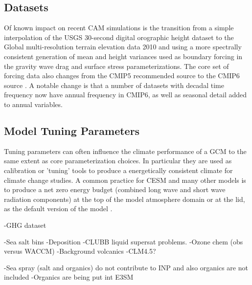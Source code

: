 \subsection{Datasets}
Of known impact on recent CAM simulations is the transition from a simple interpolation of the USGS 30-second digital orographic height dataset \citep[GTOPO30,][]{Gesch1999} to the Global multi-resolution terrain elevation data 2010 \citep[GMTED2010,][]{Danielson2011} and using a more spectrally consistent generation of mean and height variances \citep{Lauritzen2015} used as boundary forcing in the gravity wave drag and surface stress \citep{Beljaars2004} parameterizations. The core set of forcing data also changes from the CMIP5 \citep{Lamarque2010} recommended source to the CMIP6 source \citep{Feng2020}. A notable change is that a number of datasets with decadal time frequency now have annual frequency in CMIP6, as well as seasonal detail added to annual variables.

\subsection{Model Tuning Parameters}
Tuning parameters can often influence the climate performance of a GCM to the same extent as core parameterization choices. In particular they are used as calibration or 'tuning' tools to produce a energetically consistent climate for climate change studies. A common practice for CESM and many other models \citep{Schmidt2017} is to produce a net zero energy budget (combined long wave and short wave radiation components) at the top of the model atmosphere domain or at the lid, as the default version of the model \citep{Danabasoglu2020}.

-GHG dataset

-Sea salt bins
-Deposition
-CLUBB liquid supersat problems.
-Ozone chem (obs versus WACCM)
-Background volcanics
-CLM4.5?

-Sea spray (salt and organics) do not contribute to INP and also organics are not included
-Organics are being put int E3SM